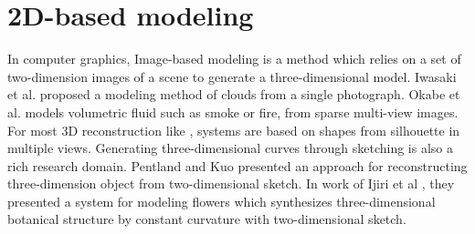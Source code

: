 \section{2D-based modeling}

In computer graphics, Image-based modeling is a method which relies on a set of two-dimension images of a scene to generate a three-dimensional model. Iwasaki et al. \cite{Cloud} proposed a modeling method of clouds from a single photograph. Okabe et al. \cite{Fluid} models volumetric fluid such as smoke or fire, from sparse multi-view images. For most 3D reconstruction like \cite{Reconstruction}, systems are based on shapes from silhouette in multiple views. Generating three-dimensional curves through sketching is also a rich research domain. Pentland and Kuo \cite{Sketch} presented an approach for reconstructing three-dimension object from two-dimensional sketch. In work of Ijiri et al \cite{Plant}, they presented a system for modeling flowers which synthesizes three-dimensional botanical structure by constant curvature with two-dimensional sketch.